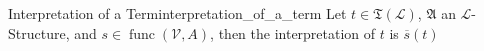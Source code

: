 \begin{definition}{Interpretation of a Term}{interpretation_of_a_term}
    Let $ t \in  \mathfrak{ T } \left( \mathcal{ L }   \right)    $, $ \mathfrak{ A }   $ an $\mathcal{L}$-Structure, and  $ s \in  \operatorname{ func } \left( \mathcal{ V } , A  \right)  $, then the interpretation of $ t $ is $ \overline{s} \left( t \right)  $ 
\end{definition}

